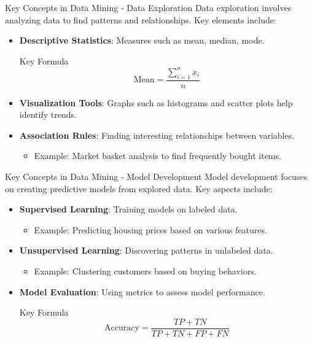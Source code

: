 \documentclass[aspectratio=169]{beamer}
\begin{document}
\begin{frame}[fragile]{Key Concepts in Data Mining - Data Exploration}
    Data exploration involves analyzing data to find patterns and relationships. Key elements include:
    \begin{itemize}
        \item \textbf{Descriptive Statistics}: Measures such as mean, median, mode.
        \begin{block}{Key Formula}
            \begin{equation}
                \text{Mean} = \frac{\sum_{i=1}^{n} x_i}{n}
            \end{equation}
        \end{block}
        \item \textbf{Visualization Tools}: Graphs such as histograms and scatter plots help identify trends.
        \item \textbf{Association Rules}: Finding interesting relationships between variables.
        \begin{itemize}
            \item Example: Market basket analysis to find frequently bought items.
        \end{itemize}
    \end{itemize}
\end{frame}

\begin{frame}[fragile]{Key Concepts in Data Mining - Model Development}
    Model development focuses on creating predictive models from explored data. Key aspects include:
    \begin{itemize}
        \item \textbf{Supervised Learning}: Training models on labeled data.
        \begin{itemize}
            \item Example: Predicting housing prices based on various features.
        \end{itemize}
        \item \textbf{Unsupervised Learning}: Discovering patterns in unlabeled data.
        \begin{itemize}
            \item Example: Clustering customers based on buying behaviors.
        \end{itemize}
        \item \textbf{Model Evaluation}: Using metrics to assess model performance.
        \begin{block}{Key Formula}
            \begin{equation}
                \text{Accuracy} = \frac{TP + TN}{TP + TN + FP + FN}
            \end{equation}
        \end{block}
    \end{itemize}
\end{frame}
\end{document}
